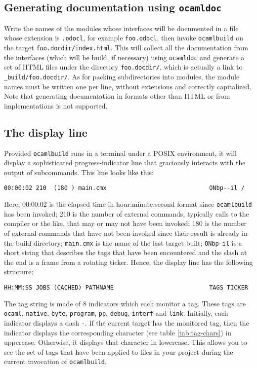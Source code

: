 \documentclass[9pt]{article}
\newcommand{\ocb}{\texttt{ocamlbuild}\xspace}
\begin{document}
\subsection{Generating documentation using \texttt{ocamldoc}}
Write the names of the modules whose interfaces will be documented in a file
whose extension is \texttt{.odocl}, for example \texttt{foo.odocl}, then invoke
\ocb on the target \texttt{foo.docdir/index.html}.  This will collect all the
documentation from the interfaces (which will be build, if necessary) using
\texttt{ocamldoc} and generate a set of HTML files under the directory
\texttt{foo.docdir/}, which is actually a link to \texttt{\_build/foo.docdir/}.
As for packing subdirectories into modules, the module names must be written
one per line, without extensions and correctly capitalized.  Note that
generating documentation in formats other than HTML or from implementations is
not supported.
\subsection{The display line}
Provided \ocb runs in a terminal under a POSIX environment, it will
display a sophisticated progress-indicator line that graciously interacts
with the output of subcommands.  This line looks like this:
\begin{verbatim}
00:00:02 210  (180 ) main.cmx                             ONbp--il /
\end{verbatim}
Here, 00:00:02 is the elapsed time in hour:minute:second format since \ocb has
been invoked; 210 is the number of external commands, typically calls to the
compiler or the like, that may or may not have been invoked; 180 is the number
of external commands that have not been invoked since their result is already
in the build directory; \texttt{main.cmx} is the name of the last target built;
\texttt{ONbp--il} is a short string that describes the tags that have been
encountered and the slash at the end is a frame from a rotating ticker.  Hence,
the display line has the following structure:
\begin{verbatim}
HH:MM:SS JOBS (CACHED) PATHNAME                           TAGS TICKER
\end{verbatim}

The tag string is made of 8 indicators which each monitor a tag. These tags
are \texttt{ocaml}, \texttt{native}, \texttt{byte}, \texttt{program},
\texttt{pp}, \texttt{debug}, \texttt{interf} and \texttt{link}.  Initially,
each indicator displays a dash \texttt{-}.  If the current target has the
monitored tag, then the indicator displays the corresponding character
(see table \ref{tab:tag-chars}) in uppercase.  Otherwise, it displays that
character in lowercase.  This allows you to see the set of tags that have
been applied to files in your project during the current invocation of \ocb.
\end{document}
